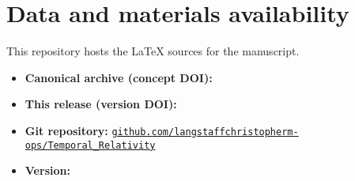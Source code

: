 \section*{Data and materials availability}
This repository hosts the \LaTeX{} sources for the manuscript.

\begin{itemize}
  \item \textbf{Canonical archive (concept DOI):} 
  \href{https://doi.org/\RepoConceptDOI}{\RepoConceptDOI}

  \item \textbf{This release (version DOI):} 
  \href{https://doi.org/\PaperDOI}{\PaperDOI}

  \item \textbf{Git repository:} 
  \href{\RepoGitHubURL}{\texttt{github.com/langstaffchristopherm-ops/Temporal\_Relativity}} 

  \item \textbf{Version:} \PaperVersion
\end{itemize}
